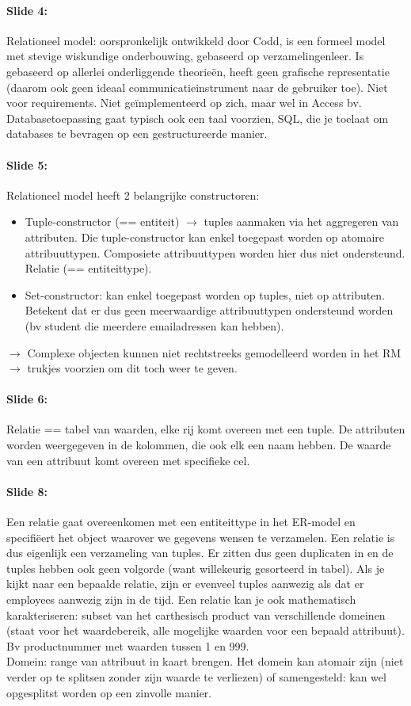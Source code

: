 \documentclass[10pt,a4paper]{report}
\begin{document}
\paragraph{Slide 4:}Relationeel model: oorspronkelijk ontwikkeld door Codd, is een formeel model met stevige wiskundige onderbouwing, gebaseerd op verzamelingenleer. Is gebaseerd op allerlei onderliggende theorieën, heeft geen grafische representatie (daarom ook geen ideaal communicatieinstrument naar de gebruiker toe). Niet voor requirements. Niet geïmplementeerd op zich, maar wel in Access bv.
Databasetoepassing gaat typisch ook een taal voorzien, SQL, die je toelaat om databases te bevragen op een gestructureerde manier. 

\paragraph{Slide 5:}Relationeel model heeft 2 belangrijke constructoren: 
\begin{itemize}
\item Tuple-constructor (== entiteit) $\rightarrow$ tuples aanmaken via het aggregeren van attributen. Die tuple-constructor kan enkel toegepast worden op atomaire attribuuttypen. Composiete attribuuttypen worden hier dus niet ondersteund.
Relatie (== entiteittype).
\item Set-constructor: kan enkel toegepast worden op tuples, niet op attributen. Betekent dat er dus geen meerwaardige attribuuttypen ondersteund worden (bv student die meerdere emailadressen kan hebben).
\end{itemize}
$\rightarrow$ Complexe objecten kunnen niet rechtstreeks gemodelleerd worden in het RM $\rightarrow$ trukjes voorzien om dit toch weer te geven.

\paragraph{Slide 6:}Relatie == tabel van waarden, elke rij komt overeen met een tuple. De attributen worden weergegeven in de kolommen, die ook elk een naam hebben. De waarde van een attribuut komt overeen met specifieke cel.

\paragraph{Slide 8:}Een relatie gaat overeenkomen met een entiteittype in het ER-model en specifiëert het object waarover we gegevens wensen te verzamelen. Een relatie is dus eigenlijk een verzameling van tuples. Er zitten dus geen duplicaten in en de tuples hebben ook geen volgorde (want willekeurig gesorteerd in tabel). Als je kijkt naar een bepaalde relatie, zijn er evenveel tuples aanwezig als dat er employees aanwezig zijn in de tijd.
Een relatie kan je ook mathematisch karakteriseren: subset van het carthesisch product van verschillende domeinen (staat voor het waardebereik, alle mogelijke waarden voor een bepaald attribuut). Bv productnummer met waarden tussen 1 en 999.\\
Domein: range van attribuut in kaart brengen.
Het domein kan atomair zijn (niet verder op te splitsen zonder zijn waarde te verliezen) of samengesteld: kan wel opgesplitst worden op een zinvolle manier.
\end{document}
